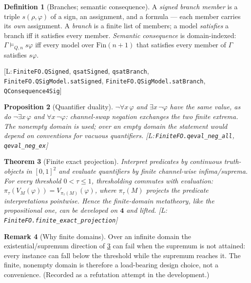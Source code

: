 \documentclass[11pt,a4paper]{article}
\newtheorem{theorem}{Theorem}[section]
\newtheorem{proposition}[theorem]{Proposition}
\theoremstyle{definition}
\newtheorem{definition}[theorem]{Definition}
\newtheorem{remark}[theorem]{Remark}
\newcommand{\FOUR}{\mathbf{4}}
\newcommand{\proj}[1]{\pi_{#1}}
\newcommand{\lean}[1]{\texttt{#1}}
\newenvironment{leanrefs}
  {\par\smallskip\noindent\begin{minipage}{\linewidth}\small\raggedright}
  {\end{minipage}\par\smallskip}
\newcommand{\qmod}{\models_{Q,n}}
\begin{document}
\begin{definition}[Branches; semantic consequence]\label{def:consequence}
A \emph{signed branch member} is a triple $s(\rho,\varphi)$ of a sign, an
assignment, and a formula — each member carries its \emph{own} assignment.
A \emph{branch} is a finite list of members; a model \emph{satisfies} a
branch iff it satisfies every member. \emph{Semantic consequence} is
domain-indexed: $\Gamma \qmod s\varphi$ iff every model over
$\mathrm{Fin}(n{+}1)$ that satisfies every member of $\Gamma$ satisfies
$s\varphi$.
\begin{leanrefs}
[L:\,\lean{FiniteFO.QSigned}, \lean{qsatSigned}, \lean{qsatBranch},\\
\quad\lean{FiniteFO.QSigModel.satSigned},
\lean{FiniteFO.QSigModel.satBranch},\\
\quad\lean{QConsequence4Sig}]
\end{leanrefs}
\end{definition}

\begin{proposition}[Quantifier duality]\label{prop:duality}
$\lnot\forall x\,\varphi$ and $\exists x\,\lnot\varphi$ have the same
value, as do $\lnot\exists x\,\varphi$ and $\forall x\,\lnot\varphi$:
channel-swap negation exchanges the two finite extrema. The nonempty
domain is used; over an empty domain the statement would depend on
conventions for vacuous quantifiers.
[L:\,\lean{FiniteFO.qeval\_neg\_all}, \lean{qeval\_neg\_ex}]
\end{proposition}

\begin{theorem}[Finite exact projection]\label{thm:projection}
Interpret predicates by continuous truth-objects in $[0,1]^2$ and evaluate
quantifiers by finite channel-wise infima/suprema. For every threshold
$0<\tau\le 1$, thresholding commutes with evaluation:
$\proj{\tau}(V_M(\varphi)) = V_{\proj{\tau}(M)}(\varphi)$, where
$\proj{\tau}(M)$ projects the predicate interpretations pointwise. Hence
the finite-domain metatheory, like the propositional one, can be developed
on $\FOUR$ and lifted. [L:\,\lean{FiniteFO.finite\_exact\_projection}]
\end{theorem}

\begin{remark}[Why finite domains]\label{rem:infinite}
Over an infinite domain the existential/supremum direction of
\cref{thm:projection} can fail when the supremum is not attained: every
instance can fall below the threshold while the supremum reaches it. The
finite, nonempty domain is therefore a load-bearing design choice, not a
convenience. (Recorded as a refutation attempt in the development.)
\end{remark}
\end{document}
